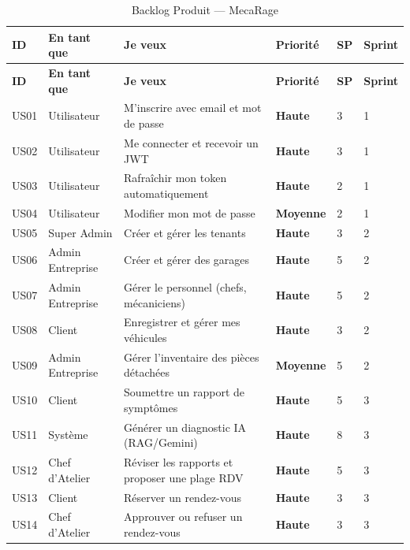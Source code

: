 \documentclass[12pt,a4paper]{report}
\begin{document}
\begin{longtable}{|p{0.7cm}|p{4cm}|p{5.5cm}|p{1.3cm}|p{0.7cm}|p{1.2cm}|}
\caption{Backlog Produit — MecaRage}\label{tab:backlog}\\
\hline
\rowcolor{indigolite!60}
\textbf{ID} & \textbf{En tant que} & \textbf{Je veux} & \textbf{Priorité} & \textbf{SP} & \textbf{Sprint} \\
\hline
\endfirsthead
\hline
\rowcolor{indigolite!60}
\textbf{ID} & \textbf{En tant que} & \textbf{Je veux} & \textbf{Priorité} & \textbf{SP} & \textbf{Sprint} \\
\hline
\endhead
\hline
\endlastfoot
US01 & Utilisateur & M'inscrire avec email et mot de passe & \textcolor{prioH}{\bfseries Haute} & 3 & 1 \\
\hline
US02 & Utilisateur & Me connecter et recevoir un JWT & \textcolor{prioH}{\bfseries Haute} & 3 & 1 \\
\hline
US03 & Utilisateur & Rafraîchir mon token automatiquement & \textcolor{prioH}{\bfseries Haute} & 2 & 1 \\
\hline
US04 & Utilisateur & Modifier mon mot de passe & \textcolor{prioM}{\bfseries Moyenne} & 2 & 1 \\
\hline
US05 & Super Admin & Créer et gérer les tenants & \textcolor{prioH}{\bfseries Haute} & 3 & 2 \\
\hline
US06 & Admin Entreprise & Créer et gérer des garages & \textcolor{prioH}{\bfseries Haute} & 5 & 2 \\
\hline
US07 & Admin Entreprise & Gérer le personnel (chefs, mécaniciens) & \textcolor{prioH}{\bfseries Haute} & 5 & 2 \\
\hline
US08 & Client & Enregistrer et gérer mes véhicules & \textcolor{prioH}{\bfseries Haute} & 3 & 2 \\
\hline
US09 & Admin Entreprise & Gérer l'inventaire des pièces détachées & \textcolor{prioM}{\bfseries Moyenne} & 5 & 2 \\
\hline
US10 & Client & Soumettre un rapport de symptômes & \textcolor{prioH}{\bfseries Haute} & 5 & 3 \\
\hline
US11 & Système & Générer un diagnostic IA (RAG/Gemini) & \textcolor{prioH}{\bfseries Haute} & 8 & 3 \\
\hline
US12 & Chef d'Atelier & Réviser les rapports et proposer une plage RDV & \textcolor{prioH}{\bfseries Haute} & 5 & 3 \\
\hline
US13 & Client & Réserver un rendez-vous & \textcolor{prioH}{\bfseries Haute} & 3 & 3 \\
\hline
US14 & Chef d'Atelier & Approuver ou refuser un rendez-vous & \textcolor{prioH}{\bfseries Haute} & 3 & 3 \\

\end{longtable}
\end{document}
